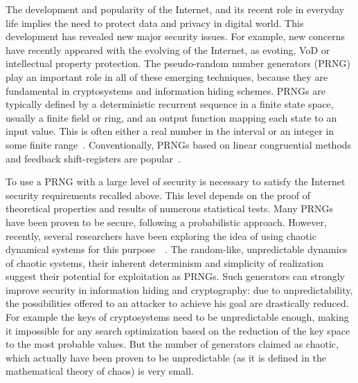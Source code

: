 \documentclass[10pt, a4paper, conference, compsocconf]{IEEEtran}
\begin{document}
The development and popularity of the Internet, and its recent role in everyday life implies the need to protect data and privacy in digital world. This development has revealed new major security issues. For example, new concerns have recently appeared with the evolving of the Internet, as evoting, VoD or intellectual property protection. The pseudo-random number generators (PRNG) play an important role in all of these emerging techniques, because they are fundamental in cryptosystems and information hiding schemes. 
PRNGs are typically defined by a deterministic recurrent sequence in a finite state space, usually a finite field or ring, and an output function mapping each state to an input value. This is often either a real number in the interval  or an integer in some finite range~\cite{L'ecuyer2008}. Conventionally, PRNGs based on linear congruential methods and feedback shift-registers are popular~\cite{Knuth1998}.

To use a PRNG with a large level of security is necessary to satisfy the Internet security requirements recalled above.
This level depends on the proof of theoretical properties and results of numerous statistical tests. 
Many PRNGs have been proven to be secure, following a probabilistic approach. 
However, recently, several researchers have been exploring the idea of using chaotic dynamical systems for this purpose~\cite{Falcioni2005}~\cite{Cecen2009}. 
The random-like, unpredictable dynamics of chaotic systems, their inherent determinism and simplicity of realization suggest their potential for exploitation as PRNGs.
Such generators can strongly improve security in information hiding and cryptography: due to unpredictability, the possibilities offered to an attacker to achieve his goal are drastically reduced. 
For example the keys of cryptosystems need to be unpredictable enough, making it impossible for any search optimization based on the reduction of the key space to the most probable values. 
But the number of generators claimed as chaotic, which actually have been proven to be unpredictable (as it is defined in the mathematical theory of chaos) is very small.
 
\end{document}
